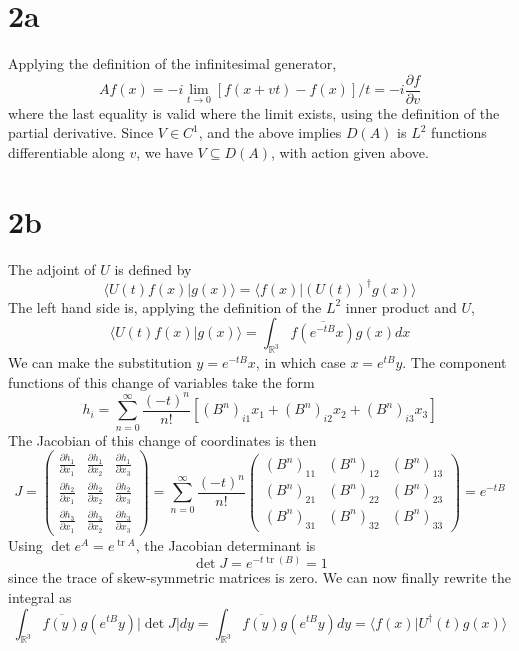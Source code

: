 \message{ !name(hw1.tex)}\documentclass{article}
\DeclareMathOperator{\tr}{tr}
\begin{document}
\section*{2a}
Applying the definition of the infinitesimal generator,
\[
  Af(x)=-i\lim_{t\to 0}[f(x+vt)-f(x)]/t = -i\frac{\partial f}{\partial v}
\]
where the last equality is valid where the limit exists, using the definition of the partial derivative.
Since $V\in C^1$, and the above implies $D(A)$ is $L^2$ functions differentiable along $v$, we have $V\subseteq D(A)$, with action given above.

\section*{2b}
The adjoint of $U$ is defined by
\[
  \langle U(t)f(x) | g(x) \rangle = \langle f(x) | \left( U(t) \right)^{\dagger}g(x) \rangle
\]
The left hand side is, applying the definition of the $L^{2}$ inner product and $U$,
\[
  \langle U(t)f(x)|g(x) \rangle = \int_{\mathbb{R}^{3}} \overline{f(e^{-tB}x)}g(x)dx
\]
We can make the substitution $y=e^{-tB}x$, in which case $x=e^{tB}y$.
The component functions of this change of variables take the form
\[
  h_{i}=\sum_{n=0}^{\infty}\frac{(-t)^{n}}{n!}\left[\left(B^{n}\right)_{i1}x_{1}+\left(B^{n}\right)_{i2}x_{2}+\left(B^{n}\right)_{i3}x_{3}\right]
\]
The Jacobian of this change of coordinates is then
\[
  J=
  \begin{pmatrix}
    \frac{\partial h_{1}}{\partial x_{1}} & \frac{\partial h_{1}}{\partial x_{2}} & \frac{\partial h_{1}}{\partial x_{3}} \\
    \frac{\partial h_{2}}{\partial x_{1}} & \frac{\partial h_{2}}{\partial x_{2}} & \frac{\partial h_{2}}{\partial x_{3}} \\
    \frac{\partial h_{3}}{\partial x_{1}} & \frac{\partial h_{3}}{\partial x_{2}} & \frac{\partial h_{3}}{\partial x_{3}}
  \end{pmatrix}
  =
  \sum_{n=0}^{\infty}\frac{(-t)^{n}}{n!}
  \begin{pmatrix}
    (B^{n})_{11} & (B^{n})_{12} & (B^{n})_{13} \\
    (B^{n})_{21} & (B^{n})_{22} & (B^{n})_{23} \\
    (B^{n})_{31} & (B^{n})_{32} & (B^{n})_{33}
  \end{pmatrix}
  =e^{-tB}
\]
Using $\det e^{A}=e^{\tr A}$, the Jacobian determinant is
\[
  \det J = e^{-t\tr(B)}=1
\]
since the trace of skew-symmetric matrices is zero.
We can now finally rewrite the integral as
\[
  \int_{\mathbb{R}^{3}}\overline{f(y)}g(e^{tB}y)|\det J|dy=  \int_{\mathbb{R}^{3}}\overline{f(y)}g(e^{tB}y)dy
  =\langle f(x)|U^{\dagger}(t)g(x) \rangle
\]
\end{document}
